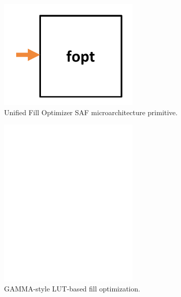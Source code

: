 \begin{figure}[ht]
    \centering
    \includegraphics[width=0.6\textwidth]{figures/uniform_fopt.pdf}
    \caption{Unified Fill Optimizer SAF microarchitecture primitive.}
    \label{fig:uniform_fopt}
\end{figure}

\begin{figure}[ht]
    \centering
    \includegraphics[width=0.6\textwidth]{figures/leader_lut.pdf}
    \caption{GAMMA\cite{gamma}-style LUT-based fill optimization.}
    \label{fig:leader_lut}
\end{figure}

